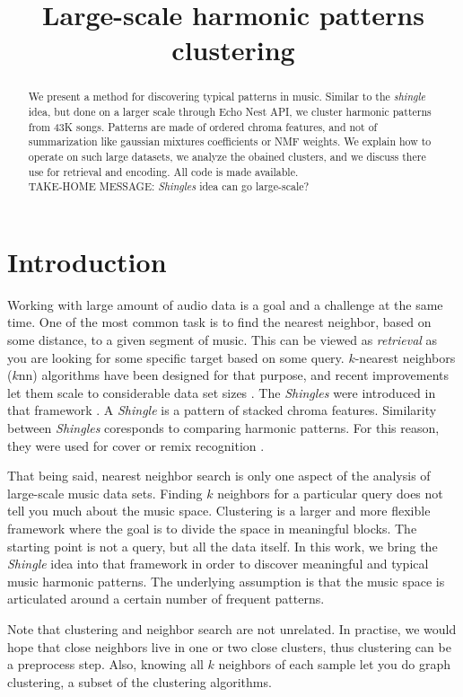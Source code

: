 \documentclass{article}
\title{Large-scale harmonic patterns clustering}
\begin{document}
%
\maketitle
%
\begin{abstract}
We present a method for discovering typical patterns in music.
Similar to the \textit{shingle} idea, but done on a larger scale through
Echo Nest API, we cluster harmonic patterns from 43K songs. Patterns are
made of ordered chroma features, and not of summarization like gaussian
mixtures coefficients or NMF weights. We explain
how to operate on such large datasets, we analyze the obained clusters,
and we discuss there use for retrieval and encoding. All code is made
available.\\
TAKE-HOME MESSAGE: \textit{Shingles} idea can go large-scale?
\end{abstract}
%
\section{Introduction}\label{sec:introduction}

Working with large amount of audio data is a goal and a challenge at the
same time. One of the most common task is to find the nearest neighbor,
based on some distance, to a given segment of music. This can be viewed
as \textit{retrieval} as you are looking for some specific target
based on some query. $k$-nearest neighbors ($k$nn) algorithms have been
designed for that purpose, and recent improvements let them scale to
considerable data set sizes \cite{Datar2004}. The \textit{Shingles}
were introduced in that framework \cite{Casey2006}. A \textit{Shingle}
is a pattern of stacked chroma features. Similarity between
\textit{Shingles} coresponds to comparing harmonic patterns. For this
reason, they were used for cover or remix recognition \cite{Casey2007}.

That being said, nearest neighbor search is only one aspect of the
analysis of large-scale music data sets. Finding $k$ neighbors for a
particular query does not tell you much about the music space.
Clustering is a larger and more flexible framework where the goal is
to divide the space in meaningful blocks. The starting point is not
a query, but all the data itself. In this work, we bring the
\textit{Shingle} idea into that framework in order to discover
meaningful and typical music harmonic patterns. The underlying assumption
is that the music space is articulated around a certain number of
frequent patterns.

Note that clustering and neighbor search are not unrelated.
In practise, we would hope that close neighbors live in one or two
close clusters, thus clustering can be a preprocess step. Also,
knowing all $k$ neighbors of each sample let you do graph clustering,
a subset of the clustering algorithms.
\end{document}

